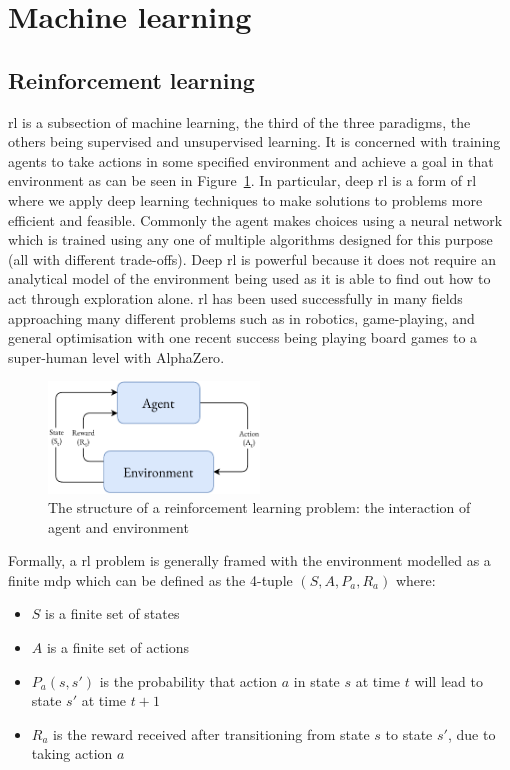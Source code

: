 \section{Machine learning}

\subsection{Reinforcement learning}

\Acl{rl}\cite{sutton2018reinforcement} is a subsection of machine learning, the third of the three paradigms, the others being supervised and unsupervised learning. It is concerned with training agents to take actions in some specified environment and achieve a goal in that environment as can be seen in Figure~\ref{fig:reinforcement_learning}. In particular, deep \ac{rl}\cite{MAL-071} is a form of \ac{rl} where we apply deep learning techniques to make solutions to problems more efficient and feasible. Commonly the agent makes choices using a neural network which is trained using any one of multiple algorithms designed for this purpose (all with different trade-offs). Deep \ac{rl} is powerful because it does not require an analytical model of the environment being used as it is able to find out how to act through exploration alone. \Ac{rl} has been used successfully in many fields approaching many different problems such as in robotics\cite{gavrilov2011mobile}, game-playing\cite{tesauro1995temporal}, and general optimisation with one recent success being playing board games to a super-human level with AlphaZero\cite{Silver1140}.

\begin{figure}
    \centering
    \includegraphics[width=0.5\textwidth]{figures/reinforcement_learning.pdf}
    \caption{The structure of a reinforcement learning problem: the interaction of agent and environment}
    \label{fig:reinforcement_learning}
\end{figure}

Formally, a \ac{rl} problem is generally framed with the environment modelled as a finite \ac{mdp} which can be defined as the 4-tuple $(S, A, P_a, R_a)$ where:
\begin{itemize}
    \item $S$ is a finite set of states
    \item $A$ is a finite set of actions
    \item $P_a(s,s')$ is the probability that action $a$ in state $s$ at time $t$ will lead to state $s'$ at time $t + 1$
    \item $R_a$ is the reward received after transitioning from state $s$ to state $s'$, due to taking action $a$
\end{itemize}

